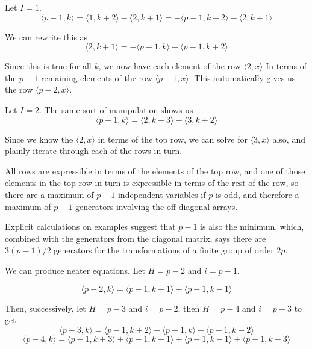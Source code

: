 \documentclass{revtex4-1}
\begin{document}
\par Let $I=1$.
\begin{equation}
\langle p-1, k \rangle = \langle 1, k+2 \rangle - \langle 2, k+1 \rangle =
-\langle p-1, k+2 \rangle - \langle 2, k+1 \rangle
\end{equation}

We can rewrite this as
\begin{equation}
\langle 2, k+1 \rangle = - \langle p-1, k \rangle + \langle p-1, k+2 \rangle
\end{equation}

Since this is true for all $k$, we now have each element of the row $\langle 2,x \rangle$
In terms of the $p-1$ remaining elements of the row $\langle p-1, x \rangle$.  This
automatically gives us the row $\langle p-2, x \rangle$.

\par Let $I=2$.  The same sort of manipulation shows us
\begin{equation}
\langle p-1, k \rangle = \langle 2, k+3 \rangle - \langle 3, k+2 \rangle
\end{equation}

Since we know the $\langle 2, x \rangle$ in terms of the top row, we can solve
for $\langle 3, x \rangle$ also, and plainly iterate through each of the rows in turn.

\par All rows are expressible in terms of the elements of the top row, and one of 
those elements in the top row in turn is expressible in terms of the rest of the row, so there are a maximum
of $p-1$ independent variables if $p$ is odd, and therefore a maximum of $p-1$ generators
involving the off-diagonal arrays.

\par Explicit calculations on examples suggest that $p-1$ is also the minimum, which,
combined with the generators from the diagonal matrix, says there are $3 (p-1)/2$ 
generators for the transformations of a finite group of order $2p$.

\par We can produce neater equations.  Let $H=p-2$ and $i=p-1$.

\begin{equation}
\langle p-2, k \rangle = \langle p-1, k+1 \rangle + \langle p-1, k-1 \rangle
\end{equation}

Then, successively, let $H=p-3$ and $i=p-2$, then $H=p-4$ and $i=p-3$ to get
\begin{equation}
\langle p-3, k \rangle = \langle p-1, k+2 \rangle + \langle p-1, k \rangle + \langle p-1, k-2 \rangle
\end{equation}
\begin{equation}
\langle p-4, k \rangle = \langle p-1, k+3 \rangle + \langle p-1, k+1 \rangle +
\langle p-1, k-1 \rangle + \langle p-1, k-3 \rangle
\end{equation}
\end{document}
